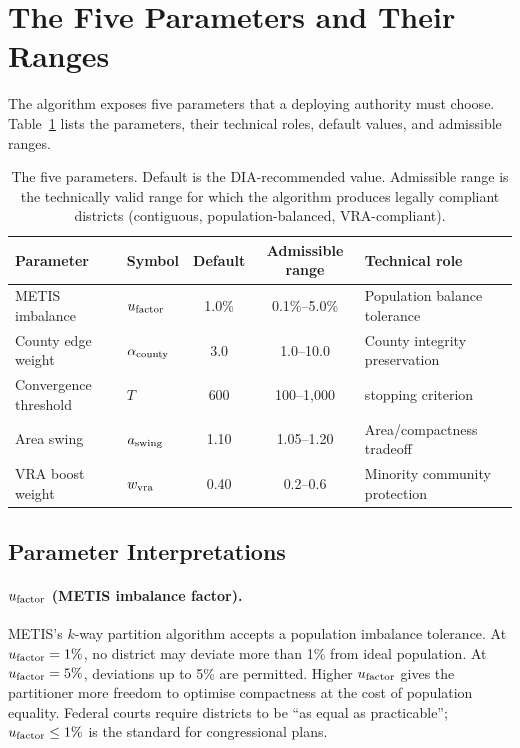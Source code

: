 \section{The Five Parameters and Their Ranges}
\label{sec:parameters}

The \bisect{} algorithm exposes five parameters that a deploying authority
must choose.
Table~\ref{tab:params} lists the parameters, their technical roles, default
values, and admissible ranges.

\begin{table}[h]
\centering
\caption{The five \bisect{} parameters. Default is the DIA-recommended value.
         Admissible range is the technically valid range for which the algorithm
         produces legally compliant districts (contiguous, population-balanced,
         VRA-compliant).}
\label{tab:params}
\begin{tabular}{llccl}
\toprule
Parameter & Symbol & Default & Admissible range & Technical role \\
\midrule
METIS imbalance & $u_{\mathrm{factor}}$ & 1.0\% & 0.1\%--5.0\% & Population balance tolerance \\
County edge weight & $\alpha_{\mathrm{county}}$ & 3.0 & 1.0--10.0 & County integrity preservation \\
Convergence threshold & $T$ & 600 & 100--1{,}000 & \cs{} stopping criterion \\
Area swing & $a_{\mathrm{swing}}$ & 1.10 & 1.05--1.20 & Area/compactness tradeoff \\
VRA boost weight & $w_{\mathrm{vra}}$ & 0.40 & 0.2--0.6 & Minority community protection \\
\bottomrule
\end{tabular}
\end{table}

\subsection{Parameter Interpretations}

\paragraph{$u_{\mathrm{factor}}$ (METIS imbalance factor).}
METIS's $k$-way partition algorithm accepts a population imbalance tolerance.
At $u_{\mathrm{factor}} = 1\%$, no district may deviate more than 1\% from ideal
population.
At $u_{\mathrm{factor}} = 5\%$, deviations up to 5\% are permitted.
Higher $u_{\mathrm{factor}}$ gives the partitioner more freedom to optimise compactness
at the cost of population equality.
Federal courts require districts to be ``as equal as practicable'';
$u_{\mathrm{factor}} \leq 1\%$ is the standard for congressional plans.

